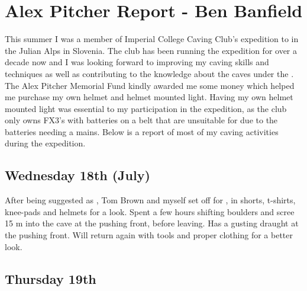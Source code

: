 \section{Alex Pitcher Report - Ben Banfield}


This summer I was a member of Imperial College Caving Club's expedition
to  in the Julian Alps in Slovenia. The club has been
running the expedition for over a decade now and I was looking forward to
improving my caving skills and techniques as well as contributing to the
knowledge about the caves under the . The Alex Pitcher
Memorial Fund kindly awarded me some money which helped me purchase my
own helmet and helmet mounted light. Having my own helmet mounted light
was essential to my participation in the expedition, as the club only
owns FX3's with batteries on a belt that are unsuitable for  due
to the batteries needing a mains. Below is a report of most of my caving
activities during the expedition.

\subsection{Wednesday 18th (July)}

After being suggested as , Tom Brown and myself set off for ,
in shorts, t-shirts, knee-pads and helmets for a look. Spent a few hours
shifting boulders and scree 15 m into the cave at the pushing front,
before leaving. Has a gusting draught at the pushing front. Will return
again with tools and proper clothing for a better look.

\subsection{Thursday 19th}

